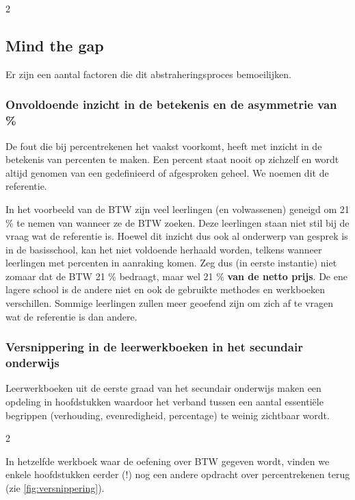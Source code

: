 \begin{multicols}{2}

\subsection{Mind the gap}

Er zijn een aantal factoren die dit abstraheringsproces bemoeilijken.

\subsubsection*{Onvoldoende inzicht in de betekenis en de asymmetrie van \%}

De fout die bij percentrekenen het vaakst voorkomt, heeft met inzicht in de betekenis van percenten te maken.
Een percent staat nooit op zichzelf en wordt altijd genomen van een gedefinieerd of afgesproken geheel.
We noemen dit de referentie.

In het voorbeeld van de BTW zijn veel leerlingen (en volwassenen) geneigd om 21 \% te nemen van  wanneer ze de BTW zoeken.
Deze leerlingen staan niet stil bij de vraag wat de referentie is.
Hoewel dit inzicht dus ook al onderwerp van gesprek is in de basisschool, kan het niet voldoende herhaald worden, telkens wanneer leerlingen met percenten in aanraking komen.
Zeg dus (in eerste instantie) niet zomaar dat de BTW 21 \% bedraagt, maar wel 21 \% \textbf{van de netto prijs}.
De ene lagere school is de andere niet en ook de gebruikte methodes en werkboeken verschillen.
Sommige leerlingen zullen meer geoefend zijn om zich af te vragen wat de referentie is dan andere.

\subsubsection*{Versnippering in de leerwerkboeken in het secundair onderwijs}

Leerwerkboeken uit de eerste graad van het secundair onderwijs maken een opdeling in hoofdstukken waardoor het verband tussen een aantal essentiële begrippen (verhouding, evenredigheid, percentage) te weinig zichtbaar wordt.



\end{multicols}
\begin{multicols}{2}

In hetzelfde werkboek waar de oefening over BTW gegeven wordt, vinden we enkele hoofdstukken eerder (!) nog een andere opdracht over percentrekenen terug (zie \autoref{fig:versnippering}).

\end{multicols}
